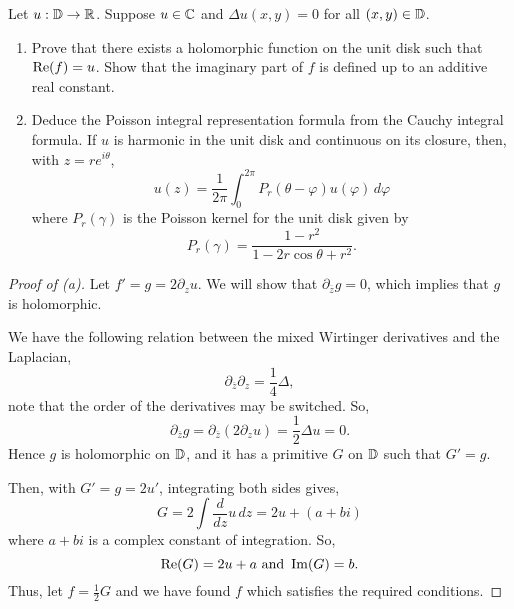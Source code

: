 \documentclass[../hw2]{subfiles}
\begin{document}
\begin{problem}
Let $u: \mathbb{D} \to \mathbb{R}$. Suppose $u\in \mathbb{C}$ and $\Delta u(x,y)=0$ for all $(x,y)\in \mathbb{D}$.
\begin{enumerate}[label=(\alph*)]
	\item Prove that there exists a holomorphic function on the unit disk such that $\operatorname{Re}(f)=u$.
	      Show that the imaginary part of $f$ is defined up to an additive real constant.
	\item Deduce the Poisson integral representation formula from the Cauchy integral formula.
	      If $u$ is harmonic in the unit disk and continuous on its closure, then, with $z=re^{i\theta}$, \[
		      u(z)=\frac{1}{2\pi}\int_{0}^{2\pi} P_r(\theta-\varphi)u(\varphi) \,d\varphi
	      \] where $P_r(\gamma)$ is the Poisson kernel for the unit disk given by  \[
		      P_r(\gamma) = \frac{1-r^2}{1-2r\cos{\theta}+r^2}
		      .\]
\end{enumerate}
\end{problem}
\begin{proof}[Proof of (a)]
	Let $f'=g=2 \partial_z u$.
	We will show that $\partial_{\overline{z}} g = 0$, which implies that $g$ is holomorphic.

	We have the following relation between the mixed Wirtinger derivatives and the Laplacian, \[
		\partial_{\overline{z}}\partial_z = \frac{1}{4}\Delta
		,\] note that the order of the derivatives may be switched.
	So, \[
		\partial_{\overline{z}} g = \partial_{\overline{z}}(2 \partial_z u) =  \frac{1}{2}\Delta u = 0
		.\]
	Hence $g$ is holomorphic on $\mathbb{D}$, and it has a primitive $G$ on  $\mathbb{D}$ such that $G' = g$.

	Then, with $G' = g = 2u'$, integrating both sides gives, \[
		G = 2 \int \frac{d}{dz} u \,dz = 2u + (a+bi)
	\] where $a+bi$ is a complex constant of integration.
	So, \[
		\operatorname{Re}(G)=2u+a \text{ and } \operatorname{Im}(G) = b
		.\]
	Thus, let $f=\frac{1}{2}G$ and we have found $f$ which satisfies the required conditions.
\end{proof}
\end{document}
